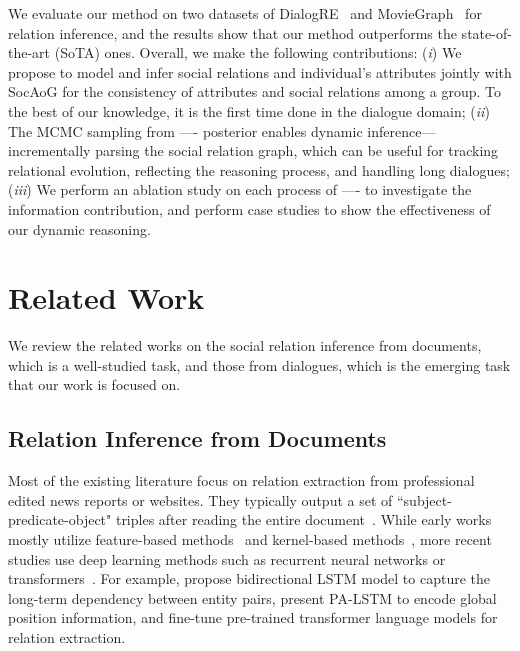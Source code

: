 \documentclass[11pt,a4paper]{article}
\begin{document}
We evaluate our method on two datasets of DialogRE~\citep{yu-etal-2020-dialogue} and MovieGraph~\cite{vicol2018moviegraphs} for relation inference, and the results show that our method outperforms the state-of-the-art (SoTA) ones. Overall, we make the following contributions: (\textit{i}) We propose to model and infer social relations and individual's attributes jointly with SocAoG for the consistency of attributes and social relations among a group. To the best of our knowledge, it is the first time done in the dialogue domain; (\textit{ii}) The MCMC sampling from ---- posterior enables dynamic inference---incrementally parsing the social relation graph, which can be useful for tracking relational evolution, reflecting the reasoning process, and handling long dialogues; (\textit{iii}) We perform an ablation study on each process of ---- to investigate the information contribution, and perform case studies to show the effectiveness of our dynamic reasoning. 


\section{Related Work}
We review the related works on the social relation inference from documents, which is a well-studied task, and those from dialogues, which is the emerging task that our work is focused on. 

\subsection{Relation Inference from Documents}
Most of the existing literature focus on relation extraction from professional edited news reports or websites. They typically output a set of ``subject-predicate-object" triples after reading the entire document~\citep{bach2007review, mintz-etal-2009-distant, kumar2017survey}. While early works mostly utilize feature-based methods~\citep{kambhatla-2004-combining, miwa-sasaki-2014-modeling, gormley-etal-2015-improved} and kernel-based methods~\citep{zelenko2003kernel, zhao-grishman-2005-extracting, mooney2006subsequence},
more recent studies use deep learning methods such as recurrent neural networks or transformers~\citep{kumar2017survey}. For example, \citet{zhou-etal-2016-attention-based} propose bidirectional LSTM model to capture the long-term dependency between entity pairs, \citet{zhang-etal-2017-position} present PA-LSTM to encode global position information, and \citet{alt-etal-2019-fine, papanikolaou-etal-2019-deep} fine-tune pre-trained transformer language models for relation extraction.
\end{document}
